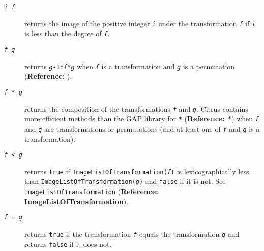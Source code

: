 \documentclass[a4paper,11pt]{report}
\begin{document}
{{\begin{description}
\item[{\texttt{\mbox{\texttt{\mdseries\slshape i}} \texttt{} \mbox{\texttt{\mdseries\slshape f}}}}]   returns the image of the positive integer \mbox{\texttt{\mdseries\slshape i}} under the transformation \mbox{\texttt{\mdseries\slshape f}} if \mbox{\texttt{\mdseries\slshape i}} is less than the degree of \mbox{\texttt{\mdseries\slshape f}}. 
\item[{\texttt{\mbox{\texttt{\mdseries\slshape f}} \texttt{} \mbox{\texttt{\mdseries\slshape g}}}}]  returns \texttt{\mbox{\texttt{\mdseries\slshape g}}\texttt{}-1*\mbox{\texttt{\mdseries\slshape f}}*\mbox{\texttt{\mdseries\slshape g}}} when \mbox{\texttt{\mdseries\slshape f}} is a transformation and \mbox{\texttt{\mdseries\slshape g}} is a permutation \texttt{\texttt{}\texttt{}} (\textbf{Reference: \texttt{}}). 
\item[{\texttt{\mbox{\texttt{\mdseries\slshape f}} * \mbox{\texttt{\mdseries\slshape g}}}}]   returns the composition of the transformations \mbox{\texttt{\mdseries\slshape f}} and \mbox{\texttt{\mdseries\slshape g}}. \textsf{Citrus} contains more efficient methods than the \textsf{GAP} library for \texttt{\texttt{}*} (\textbf{Reference: *}) when \mbox{\texttt{\mdseries\slshape f}} and \mbox{\texttt{\mdseries\slshape g}} are transformations or permutations (and at least one of \mbox{\texttt{\mdseries\slshape f}} and \mbox{\texttt{\mdseries\slshape g}} is a transformation). 
\item[{\texttt{\mbox{\texttt{\mdseries\slshape f}} {\textless} \mbox{\texttt{\mdseries\slshape g}}}}]   returns \texttt{true} if \texttt{ImageListOfTransformation(\mbox{\texttt{\mdseries\slshape f}})} is lexicographically less than \texttt{ImageListOfTransformation(\mbox{\texttt{\mdseries\slshape g}})} and \texttt{false} if it is not. See \texttt{ImageListOfTransformation} (\textbf{Reference: ImageListOfTransformation}). 
\item[{\texttt{\mbox{\texttt{\mdseries\slshape f}} = \mbox{\texttt{\mdseries\slshape g}}}}]   returns \texttt{true} if the transformation \mbox{\texttt{\mdseries\slshape f}} equals the transformation \mbox{\texttt{\mdseries\slshape g}} and returns \texttt{false} if it does not. 
\end{description}
 }

}
\end{document}
